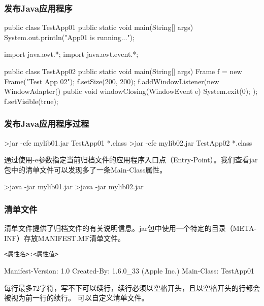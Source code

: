 \begin{frame}[fragile] %
  \frametitle{发布Java应用程序}

  
  \begin{javaCode}
    public class TestApp01 {
      public static void main(String[] args) {
        System.out.println("App01 is running...");
      }
    }  
  \end{javaCode}


  \begin{javaCode}
    import java.awt.*;
    import java.awt.event.*;

    public class TestApp02 {
      public static void main(String[] args) {
        Frame f = new Frame("Test App 02");
        f.setSize(200, 200);
        f.addWindowListener(new WindowAdapter() {
          public void windowClosing(WindowEvent e) {
            System.exit(0);
          }
        });
        f.setVisible(true);
      }
    }
  \end{javaCode}
\end{frame}

\begin{frame}[fragile] %
  \frametitle{发布Java应用程序过程}


  \begin{shCode}
    >jar -cfe mylib01.jar TestApp01 *.class
    >jar -cfe mylib02.jar TestApp02 *.class
  \end{shCode}

  通过使用-e参数指定当前归档文件的应用程序入口点（Entry-Point）。我们查看jar包中的清单文件可以发现多了一条Main-Class属性。
  \begin{shCode}
    >java -jar mylib01.jar
    >java -jar mylib02.jar
  \end{shCode}
\end{frame}

\begin{frame}[fragile] %
  \frametitle{清单文件}

  清单文件提供了归档文件的有关说明信息。jar包中使用一个特定的目录（META-INF）存放MANIFEST.MF清单文件。


\begin{verbatim}
<属性名>:<属性值>
\end{verbatim}


  \begin{shCode}
    Manifest-Version: 1.0
    Created-By: 1.6.0_33 (Apple Inc.)
    Main-Class: TestApp01
  \end{shCode}

  每行最多72字符，写不下可以续行，续行必须以空格开头，且以空格开头的行都会被视为前一行的续行。
  可以自定义清单文件。
\end{frame}

